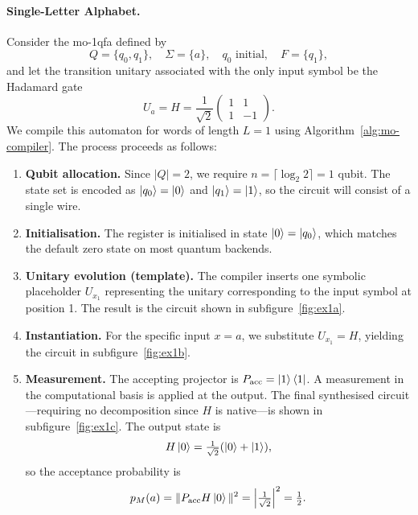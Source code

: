 \paragraph{Single-Letter Alphabet.}
\label{ex:moqfa-single-letter}
Consider the \gls{mo-1qfa} defined by
\[
Q = \{q_0, q_1\}, \quad \Sigma = \{a\}, \quad q_0 \text{ initial}, \quad F = \{q_1\},
\]
and let the transition unitary associated with the only input symbol be the Hadamard gate
\[
U_a = H = \frac{1}{\sqrt{2}}
\begin{pmatrix}
1 & 1 \\
1 & -1
\end{pmatrix}.
\]
We compile this automaton for words of length $L = 1$ using Algorithm~\ref{alg:mo-compiler}. The process proceeds as follows:

\begin{enumerate}
\item \textbf{Qubit allocation.} Since $|Q| = 2$, we require $n = \lceil \log_2 2 \rceil = 1$ qubit. The state set is encoded as $\ket{q_0} = \ket{0}$ and $\ket{q_1} = \ket{1}$, so the circuit will consist of a single wire.

\item \textbf{Initialisation.} The register is initialised in state $\ket{0} = \ket{q_0}$, which matches the default zero state on most quantum backends.

\item \textbf{Unitary evolution (template).} The compiler inserts one symbolic placeholder $\boxed{U_{x_1}}$ representing the unitary corresponding to the input symbol at position 1. The result is the circuit shown in subfigure~\ref{fig:ex1a}.

\item \textbf{Instantiation.} For the specific input $x = a$, we substitute $U_{x_1} = H$, yielding the circuit in subfigure~\ref{fig:ex1b}.

\item \textbf{Measurement.} The accepting projector is $P_{\text{acc}} = \ket{1}\bra{1}$. A measurement in the computational basis is applied at the output. The final synthesised circuit—requiring no decomposition since $H$ is native—is shown in subfigure~\ref{fig:ex1c}. The output state is
\[
H\ket{0} = \tfrac{1}{\sqrt{2}}(\ket{0} + \ket{1}),
\]
so the acceptance probability is
\[
p_M(a) = \|P_{\text{acc}} H \ket{0}\|^2 = \left|\tfrac{1}{\sqrt{2}}\right|^2 = \tfrac{1}{2}.
\]
\end{enumerate}\vspace{1em}
